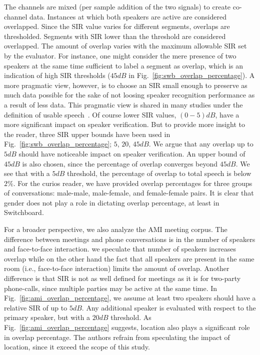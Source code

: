 \documentclass[journal]{IEEEtran}
\begin{document}
The channels are mixed (per sample addition of the two signals) to create co-channel data. 
Instances at which both speakers are active are considered overlapped. 
Since the SIR value varies for different segments, overlaps are thresholded. 
Segments with SIR lower than the threshold are considered overlapped.
The amount of overlap varies with the maximum allowable SIR set by the evaluator. 
For instance, one might consider the mere presence of two speakers at the same time sufficient to label a segment as overlap, which is an indication of high SIR thresholds ($45dB$ in Fig.~\ref{fig:swb_overlap_percentage}). 
A more pragmatic view, however, is to choose an SIR small enough to preserve as much data possible for the sake of not loosing speaker recognition performance as a result of less data. 
This pragmatic view is shared in many studies under the definition of usable speech~\cite{yantorno_report}. 
Of course lower SIR values, $(0-5) dB$, have a more significant impact on speaker verification. But to provide more insight to the reader, three SIR upper bounds have been used in Fig.~\ref{fig:swb_overlap_percentage}; $5$, $20$, $45dB$. 
We argue that any overlap up to $5dB$ should have noticeable impact on speaker verification. 
An upper bound of $45dB$ is also chosen, since the percentage of overlap converges beyond $45dB$. 
We see that with a $5dB$ threshold, the percentage of overlap to total speech is below $2\%$. 
For the curios reader, we have provided overlap percentages for three groups of conversations: male-male, male-female, and female-female pairs. 
It is clear that gender does not play a role in dictating overlap percentage, at least in Switchboard.  

For a broader perspective, we also analyze the AMI meeting corpus. 
The difference between meetings and phone conversations is in the number of speakers and face-to-face interaction. 
we speculate that number of speakers increases overlap while on the other hand the fact that all speakers are present in the same room (i.e., face-to-face interaction) limits the amount of overlap. 
Another difference is that SIR is not as well defined for meetings as it is for two-party phone-calls, since multiple parties may be active at the same time. 
In Fig.~\ref{fig:ami_overlap_percentage}, we assume at least two speakers should have a relative SIR of up to $5dB$. 
Any additional speaker is evaluated with respect to the primary speaker, but with a $20dB$ threshold. 
As Fig.~\ref{fig:ami_overlap_percentage} suggests, location also plays a significant role in overlap percentage. 
The authors refrain from speculating the impact of location, since it exceed the scope of this study. 
\end{document}
